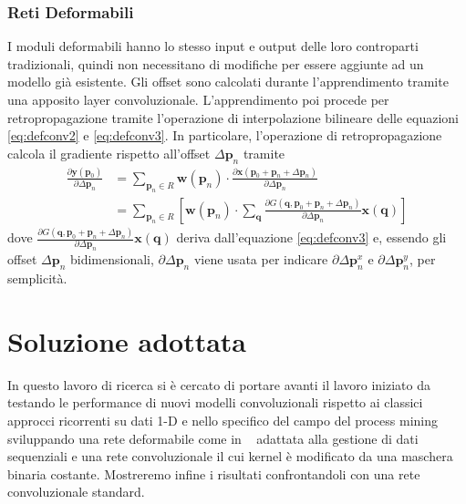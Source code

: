 \documentclass[12pt,a4paper]{report}
\begin{document}
        \subsection{Reti Deformabili}
        I moduli deformabili hanno lo stesso input e output delle loro
        controparti tradizionali, quindi non necessitano di modifiche
        per essere aggiunte ad un modello gi\`a esistente.
        Gli offset sono calcolati durante l'apprendimento tramite una
        apposito layer convoluzionale. L'apprendimento poi procede
        per retropropagazione tramite l'operazione di interpolazione
        bilineare delle equazioni \ref{eq:defconv2} e \ref{eq:defconv3}.
        In particolare, l'operazione di retropropagazione calcola il
        gradiente rispetto all'offset $\Delta\boldsymbol{p}_n$ tramite
        \begin{align} \label{eq:defconvbackprop}
            \frac{\partial\boldsymbol{y}(\boldsymbol{p}_0)}
            {\partial\Delta\boldsymbol{p}_n}&=
            \sum\limits_{\boldsymbol{p}_n\in{R}}
            \boldsymbol{w}(\boldsymbol{p}_n)\cdot
            \frac{\partial\boldsymbol{x}(\boldsymbol{p}_0+
            \boldsymbol{p}_n+\Delta\boldsymbol{p}_n)}
            {\partial\Delta\boldsymbol{p}_n}\\
            &=\sum\limits_{\boldsymbol{p}_n\in{R}}\left[
            \boldsymbol{w}(\boldsymbol{p}_n)\cdot
            \sum\limits_{\boldsymbol{q}}
            \frac{\partial G(\boldsymbol{q},\boldsymbol{p}_0+
            \boldsymbol{p}_n+\Delta\boldsymbol{p}_n)}
            {\partial\Delta\boldsymbol{p}_n}
            \boldsymbol{x}(\boldsymbol{q})\right]
        \end{align}
        dove $\frac{\partial G(\boldsymbol{q},\boldsymbol{p}_0+
        \boldsymbol{p}_n+\Delta\boldsymbol{p}_n)}
        {\partial\Delta\boldsymbol{p}_n}
        \boldsymbol{x}(\boldsymbol{q})$ deriva dall'equazione 
        \ref{eq:defconv3} e, essendo gli offset $\Delta\boldsymbol{p}_n$
        bidimensionali, $\partial\Delta\boldsymbol{p}_n$ viene usata per
        indicare $\partial\Delta\boldsymbol{p}_n^x$ e 
        $\partial\Delta\boldsymbol{p}_n^y$, per semplicit\`a.

    \chapter{Soluzione adottata}
    In questo lavoro di ricerca si \`e cercato di portare avanti il 
    lavoro iniziato da ~\cite{10.1007/978-3-030-35166-3_25} testando le
    performance di nuovi modelli convoluzionali rispetto ai classici
    approcci ricorrenti su dati 1-D e nello specifico del campo del
    process mining sviluppando una rete deformabile come in 
    ~\cite{DBLP:journals/corr/DaiQXLZHW17} adattata alla gestione di 
    dati sequenziali e una rete convoluzionale il cui kernel \`e 
    modificato da una maschera binaria costante. Mostreremo infine i 
    risultati confrontandoli con una rete convoluzionale standard.
\end{document}
